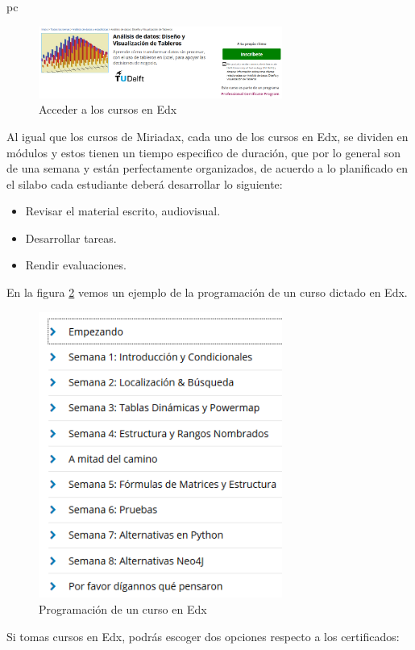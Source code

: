 pc\documentclass[a4paper,12pt,openany]{book}
\begin{document}
\begin{figure}[ht]
  \centering
	\includegraphics[width=8cm]{edx11.png}
\caption{Acceder a los cursos en Edx}
  \label{fig:edx6}
\end{figure}

Al igual que los cursos de Miriadax, cada uno de los cursos en Edx, se dividen en módulos y estos tienen un tiempo especifico de duración, que por lo general son de una semana y están perfectamente organizados, de acuerdo a lo planificado en el silabo cada estudiante deberá desarrollar lo siguiente:

\begin{itemize}
\item Revisar el material escrito, audiovisual.
\item Desarrollar tareas.
\item Rendir evaluaciones.
\end{itemize}

En la figura \ref{fig:edx12} vemos un ejemplo de la programación de un curso dictado en Edx.

\begin{figure}[ht]
  \centering
	\includegraphics[width=8cm]{edx7.png}
\caption{Programación de un curso en Edx}
  \label{fig:edx12}
\end{figure}

Si tomas cursos en Edx, podrás escoger dos opciones respecto a los certificados:
\end{document}
